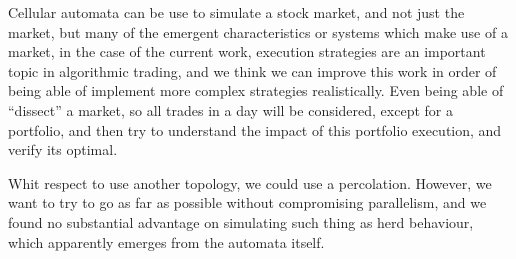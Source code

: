 \documentclass[twoside]{article}
\begin{document}
\begin{multicols}{2}
Cellular automata can be use to simulate a stock market, and not just the market, but many of the emergent characteristics or systems which make use of a market, in the case of the current work, execution strategies are an important topic in algorithmic trading, and we think we can improve this work in order of being able of implement more complex strategies realistically. Even being able of ``dissect'' a market, so all trades in a day will be considered, except for a portfolio, and then try to understand the impact of this portfolio execution, and verify its optimal.

Whit respect to use another topology, we could use a percolation. However, we want to try to go as far as possible without compromising parallelism, and we found no substantial advantage on simulating such thing as herd behaviour, which apparently emerges from the automata itself.



\end{multicols}
\end{document}
